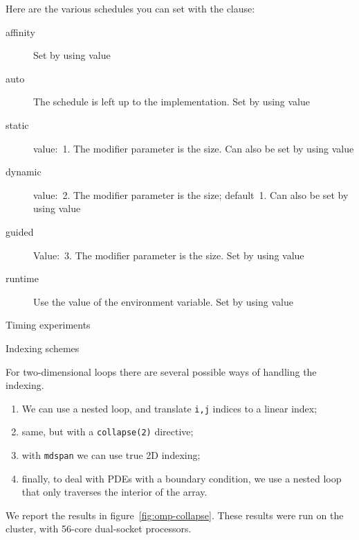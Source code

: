Here are the various schedules you can set with the
 clause:
\begin{description}
  \item[affinity] Set by using value  
  \item[auto] The schedule is left up to the implementation. Set by
    using value 
  \item[static] value:~1. The modifier parameter is the  size.
    Can also be set by using value  
  \item[dynamic] value:~2. The modifier parameter is the
     size; default~1.
    Can also be set by using value
  \item[guided] Value:~3. The modifier parameter is the
     size. Set by using value
  \item[runtime] Use the value of the 
    environment variable. Set by using value
\end{description}

 {Timing experiments}

 {Indexing schemes}

For two-dimensional loops there are several possible ways of handling the indexing.
\begin{enumerate}
\item We can use a nested loop, and translate \lstinline{i,j} indices to a linear index;
\item same, but with a \lstinline{collapse(2)} directive;
\item with  \lstinline{mdspan} we can use true 2D indexing;
\item finally, to deal with \acp{PDE} with a boundary condition, we
  use a nested loop that only traverses the interior of the array.
\end{enumerate}
We report the results in figure~\ref{fig:omp-collapse}.
These results were run on the  cluster,
with 56-core dual-socket  processors.

